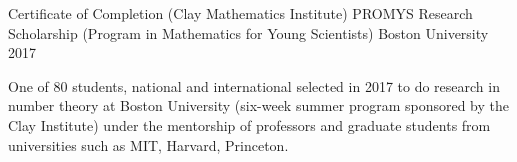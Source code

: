 \begin{cventries}
    \cventry
    {Certificate of Completion (Clay Mathematics Institute)} %
    {PROMYS Research Scholarship (Program in Mathematics for Young Scientists)} %
    {Boston University} %
    {2017} %
    {
    \begin{cvitems}
    \item One of 80 students, national and international selected in 2017 to do research in number theory at Boston University (six-week summer program sponsored by the Clay Institute) under the mentorship of professors and graduate students from universities such as MIT, Harvard, Princeton.
    \end{cvitems}
    }


\iffalse
  \cventry
    {} %
    {Berkeley City College} %
    {Berkeley, California} %
    {2016-2017} %
    {
    \begin{itemize}
    \item Chemistry
    \item Calculus III (Multivariable)
    \item GPA: 5.0
    \end{itemize}
    }
    
    \cventry
    {} %
    {MIT OpenCourseWare} %
    {} %
    {2014-2018} %
    {
    \begin{itemize}
    \item Mathematics for Computer Science (6.042)
    \item Introduction to Algorithms (6.006)
    \end{itemize}
    }
    \fi
    
\end{cventries}
